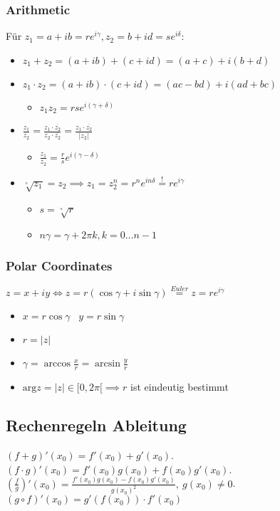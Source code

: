 \subsubsection{Arithmetic}
Für $z_1 = a + ib = re^{i \gamma}, z_2 = b + id = se^{i \delta}$:
\begin{itemize}
    \item $z_1 + z_2 = (a + ib) + (c + id) = (a + c) + i(b + d)$
    \item $z_1 \cdot z_2 = (a + ib) \cdot (c + id) = (ac - bd) + i(ad + bc)$
        \begin{itemize}
            \item $z_1 z_2 = rse^{i(\gamma + \delta)}$
        \end{itemize}
    \item $\frac{z_1}{z_2} = \frac{z_1 \cdot \overline{z_2}}{z_2 \cdot \overline{z_2}}= \frac{z_1 \cdot \overline{z_2}}{|z_2|}$
        \begin{itemize}
            \item $\frac{z_1}{z_2} = \frac{r}{s}e^{i(\gamma - \delta)}$
        \end{itemize}
        \item $\sqrt[^n]{z_1} = z_2 \implies z_1 = z_2^n = r^ne^{i n \delta} \overset{!}{=} re^{i\gamma}$
            \begin{itemize}
                \item $s = \sqrt[^n]{r}$
                \item $n \gamma = \gamma + 2 \pi k, k = 0\dots n - 1$
            \end{itemize}
\end{itemize}

\subsubsection{Polar Coordinates}
$z = x + iy \iff z = r(\cos \gamma + i \sin \gamma) \overset{Euler}{=} z = r e^{i \gamma}$
\begin{itemize}
    \item $x = r \cos \gamma$ \textbullet\ $y = r \sin \gamma$
    \item $r = |z|$
    \item $\gamma = \arccos \frac{x}{r} = \arcsin \frac{y}{r}$
    \item $\text{arg}z = |z| \in [0, 2\pi[ \implies r$ ist eindeutig bestimmt
\end{itemize}

\subsection{Rechenregeln Ableitung}
\begin{itemize}
     $(f + g)'(x_0) = f'(x_0) + g'(x_0)$.
     $(f \cdot g)'(x_0) = f'(x_0)g(x_0) + f(x_0)g'(x_0)$.
     $\left( \frac{f}{g} \right)' (x_0) = \frac{f'(x_0)g(x_0) - f(x_0)g'(x_0)}{g(x_0)^2}, \ g(x_0) \neq 0$.
     $(g \circ f)'(x_0) = g'(f(x_0)) \cdot f'(x_0)$
\end{itemize}

